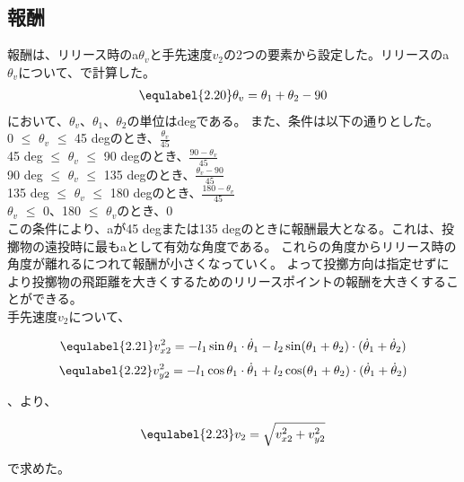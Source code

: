 \subsection{報酬}
報酬は、リリース時のa$\theta_{v}$と手先速度$v_{2}$の2つの要素から設定した。リリースのa$\theta_{v}$について、で計算した。
\begin{eqnarray}
  \equlabel{2.20}
  \theta_{v}=\theta_{1}+\theta_{2}-90
\end{eqnarray}
において、$\theta_{v}$、$\theta_{1}$、$\theta_{2}$の単位はdegである。
また、条件は以下の通りとした。\\
0 $\le$ $\theta_{v}$ $\le$ 45 degのとき、$\frac{\theta_{v}}{45}$\\
45 deg $\le$ $\theta_{v}$ $\le$ 90 degのとき、$\frac{90-\theta_{v}}{45}$\\
90 deg $\le$ $\theta_{v}$ $\le$ 135 degのとき、$\frac{\theta_{v}-90}{45}$\\
135 deg $\le$ $\theta_{v}$ $\le$ 180 degのとき、$\frac{180-\theta_{v}}{45}$\\
$\theta_{v}$ $\le$ 0、180 $\le$ $\theta_{v}$のとき、0\\

この条件により、aが45 degまたは135 degのときに報酬最大となる。これは、投擲物の遠投時に最もaとして有効な角度である。
これらの角度からリリース時の角度が離れるにつれて報酬が小さくなっていく。
よって投擲方向は指定せずにより投擲物の飛距離を大きくするためのリリースポイントの報酬を大きくすることができる。\\
手先速度$v_{2}$について、

\begin{eqnarray}
  \equlabel{2.21}
  v_{x2}^{2}=-l_{1}\sin\theta_{1}\cdot\dot{\theta}_{1}-l_2\sin(\theta_{1}+\theta_{2})\cdot(\dot{\theta}_{1}+\dot{\theta}_{2})
\end{eqnarray}
\begin{eqnarray}
  \equlabel{2.22}
  v_{y2}^{2}=-l_{1}\cos\theta_{1}\cdot\dot{\theta}_{1}+l_2\cos(\theta_{1}+\theta_{2})\cdot(\dot{\theta}_{1}+\dot{\theta}_{2})
\end{eqnarray}

、より、

\begin{eqnarray}
  \equlabel{2.23}
  v_{2}=\sqrt{v_{x2}^{2}+v_{y2}^{2}}
\end{eqnarray}

で求めた。\\

